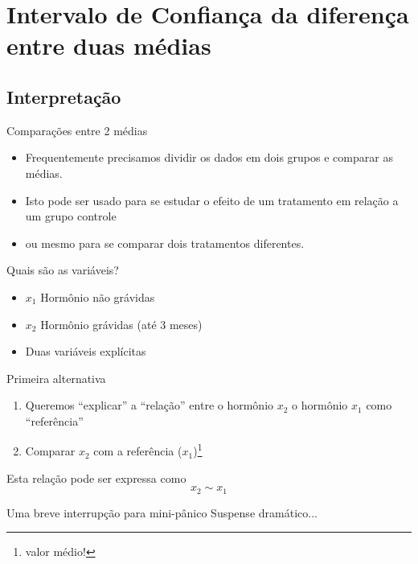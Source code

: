 \documentclass{beamer}
\begin{document}
\section[IC diferença 2 médias]{Intervalo de Confiança da diferença entre duas médias}

\subsection{Interpretação}

\begin{frame}{Comparações entre 2 médias}
  \begin{itemize}
  \item Frequentemente precisamos dividir os dados em dois grupos e
    comparar as médias.
  \item Isto pode ser usado para se estudar o efeito de um tratamento
    em relação a um grupo controle
  \item ou mesmo para se comparar dois tratamentos diferentes.
  \end{itemize}
\end{frame}


\begin{frame}{Quais são as variáveis?}
  \begin{itemize}
  \item $x_1$ Hormônio não grávidas
  \item $x_2$ Hormônio grávidas (até 3 meses)
  \item Duas variáveis explícitas
  \end{itemize}
  \begin{block}{Primeira alternativa}
    \begin{enumerate}
    \item Queremos ``explicar'' a ``relação'' entre o hormônio $x_2$  o hormônio $x_1$ como ``referência''
    \item Comparar $x_2$ com a referência ($x_1$)\footnote{valor médio!}
    \end{enumerate}
  \end{block}
  \begin{block}{Esta relação pode ser expressa como}
    \begin{displaymath}
      x_2 \sim x _1
    \end{displaymath}
  \end{block}
\end{frame}

\begin{frame}{Uma breve interrupção para mini-pânico}
  \vfill
  \vfill
  \vfill
  \vfill
  \vfill
  \hfill \small Suspense dramático...
\end{frame}
\end{document}
